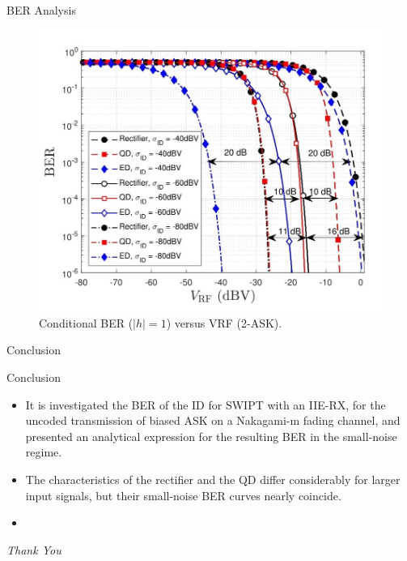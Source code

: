 \documentclass{beamer}
\begin{document}
\begin{section}{BER Analysis}
\begin{frame}
    \begin{figure}[t]
        \centering
         \includegraphics[scale=0.3]{Images/Picture5.jpg}
         \caption{ Conditional BER ($|h| = 1$) versus VRF (2-ASK).}
        \label{fig:my_label5}
        \end{figure}
\end{frame}
\end{section}
\begin{section}{Conclusion}
    \begin{frame}{Conclusion}
    \begin{itemize}
        \item It is investigated the BER of the ID for SWIPT with an IIE-RX, for the uncoded transmission of biased ASK on a Nakagami-m fading channel, and presented an analytical expression for the resulting BER in the small-noise regime.
        \item The characteristics of the rectifier and the QD differ considerably for larger input signals, but their small-noise BER curves nearly coincide.
        \item 
    \end{itemize}
\end{frame}
\end{section}
\begin{frame}
    \centering  \Huge
    \emph{ Thank You}\\
    \vspace{2cm}
    \large
\end{frame}
\end{document}
